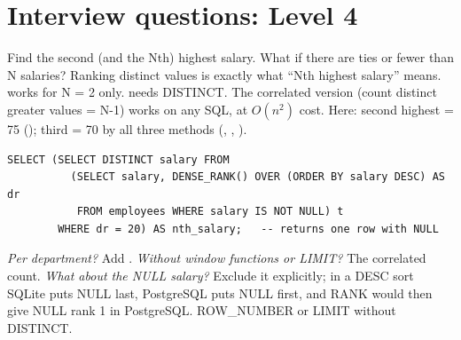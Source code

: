 \section{Interview questions: Level 4}

\begin{qa}{\classic Find the second (and the Nth) highest salary. What if there are ties or fewer than N salaries?}
\why Ranking distinct values is exactly what ``Nth highest salary'' means.  works for N = 2 only.
 needs DISTINCT. The correlated version (count distinct greater values = N-1) works on any SQL, at $O(n^2)$ cost.
\worked Here: second highest = 75 (); third = 70 by all three methods (, ,
).
\begin{lstlisting}[style=sql]
SELECT (SELECT DISTINCT salary FROM
          (SELECT salary, DENSE_RANK() OVER (ORDER BY salary DESC) AS dr
           FROM employees WHERE salary IS NOT NULL) t
        WHERE dr = 20) AS nth_salary;   -- returns one row with NULL
\end{lstlisting}
\pushes \emph{Per department?} Add . \emph{Without window functions or LIMIT?} The correlated count. \emph{What about the NULL
salary?} Exclude it explicitly; in a DESC sort SQLite puts NULL last, PostgreSQL puts NULL first, and RANK would then give NULL rank 1 in PostgreSQL.
\pitfall ROW\_NUMBER or LIMIT without DISTINCT.
\end{qa}

